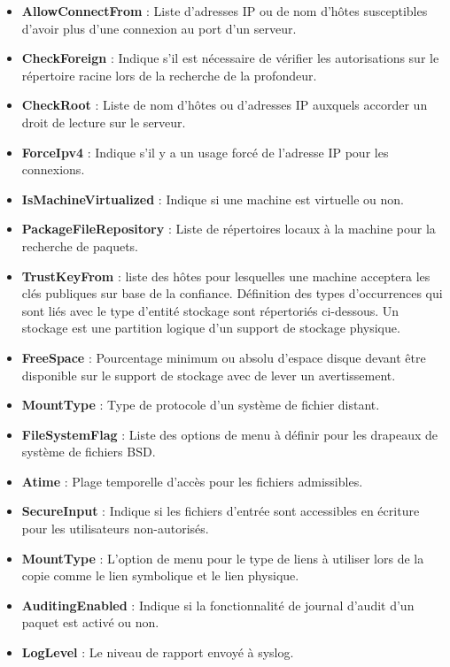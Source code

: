\begin{itemize}
  \item \textbf{AllowConnectFrom} : Liste d'adresses IP ou de nom d'hôtes
	  susceptibles d'avoir plus d'une connexion au port d'un serveur.
  \item \textbf{CheckForeign} : Indique s'il est nécessaire de vérifier les
	  autorisations sur le répertoire racine lors de la recherche de la
	  profondeur.
  \item \textbf{CheckRoot} : Liste de nom d'hôtes ou d'adresses IP auxquels
	  accorder un droit de lecture sur le serveur.
  \item \textbf{ForceIpv4} : Indique s'il y a un usage forcé de l'adresse IP
	  pour les connexions.
  \item \textbf{IsMachineVirtualized} : Indique si une machine est virtuelle ou
	  non.
  \item \textbf{PackageFileRepository} : Liste de répertoires locaux à la
	  machine pour la recherche de paquets.
  \item \textbf{TrustKeyFrom} : liste des hôtes pour lesquelles une machine
	  acceptera les clés publiques sur base de la confiance. Définition des
	  types d'occurrences qui sont liés avec le type d'entité stockage sont
	  répertoriés ci-dessous. Un stockage est une partition logique d'un
	  support de stockage physique.
  \item \textbf{FreeSpace} : Pourcentage minimum ou absolu d'espace disque
	  devant être disponible sur le support de stockage avec de lever un
	  avertissement.
  \item \textbf{MountType} : Type de protocole d'un système de fichier distant. 
  \item \textbf{FileSystemFlag} : Liste des options de menu à définir pour les
	  drapeaux de système de fichiers BSD. 
  \item \textbf{Atime} : Plage temporelle d'accès pour les fichiers
	  admissibles.
  \item \textbf{SecureInput} : Indique si les fichiers d'entrée sont accessibles
	  en écriture pour les utilisateurs non-autorisés.
  \item \textbf{MountType} : L'option de menu pour le type de liens à utiliser
	  lors de la copie comme le lien symbolique et le lien physique.
  \item \textbf{AuditingEnabled} : Indique si la fonctionnalité de journal
	  d'audit d'un paquet est activé ou non.
  \item \textbf{LogLevel} : Le niveau de rapport envoyé à syslog.

\end{itemize}
